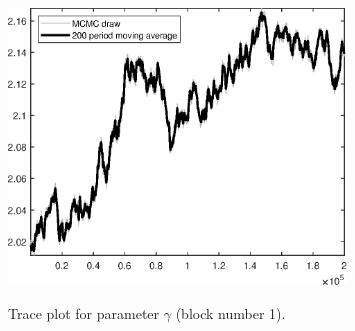 \begin{figure}[H]
\centering
  \includegraphics[width=0.8\textwidth]{RBC_growth/graphs/TracePlot_gam_blck_1}\\
    \caption{Trace plot for parameter ${\gamma}$ (block number 1).}
\end{figure}
